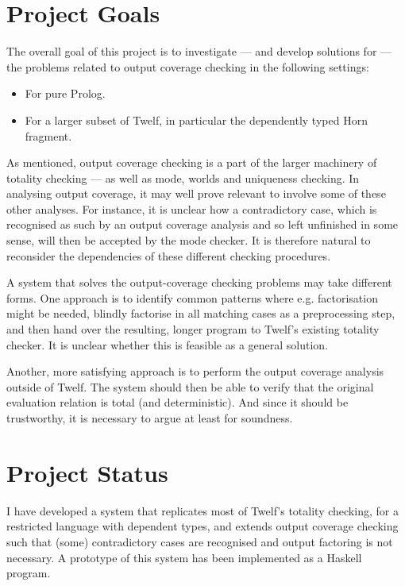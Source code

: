 \documentclass[12pt]{article}
\begin{document}
\section*{Project Goals}

The overall goal of this project is to investigate --- and develop solutions for --- the problems related to output coverage checking in the following settings:

\begin{itemize}
	\item For pure Prolog.
  \item For a larger subset of Twelf, in particular the dependently typed Horn fragment.
\end{itemize}

As mentioned, output coverage checking is a part of the larger machinery of totality checking --- as well as mode, worlds and uniqueness checking.
In analysing output coverage, it may well prove relevant to involve some of these other analyses.
For instance, it is unclear how a contradictory case, which is recognised as such by an output coverage analysis and so left unfinished in some sense, will then be accepted by the mode checker.
It is therefore natural to reconsider the dependencies of these different checking procedures.

A system that solves the output-coverage checking problems may take different forms.
One approach is to identify common patterns where e.g. factorisation might be needed, blindly factorise in all matching cases as a preprocessing step, and then hand over the resulting, longer program to Twelf's existing totality checker.
It is unclear whether this is feasible as a general solution.

Another, more satisfying approach is to perform the output coverage analysis outside of Twelf.
The system should then be able to verify that the original evaluation relation is total (and deterministic).
And since it should be trustworthy, it is necessary to argue at least for soundness.

\newpage %

\section*{Project Status}

I have developed a system that replicates most of Twelf's totality checking, for a restricted language with dependent types, and extends output coverage checking such that (some) contradictory cases are recognised and output factoring is not necessary.
A prototype of this system has been implemented as a Haskell program.
\end{document}
